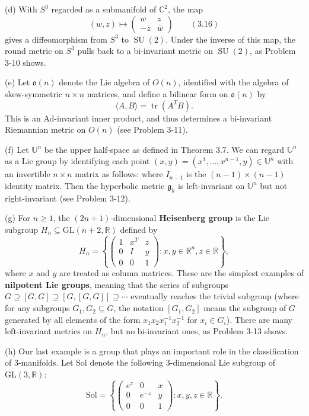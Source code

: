 \begin{example}
(d) With $S^3$ regarded as a submanifold of $\mathbb{C}^2$, the map
\[
(w, z) \mapsto \begin{pmatrix} w & z \\ -\overline{z} & \overline{w} \end{pmatrix} \qquad (3.16)
\]
gives a diffeomorphism from $S^3$ to $\operatorname{SU}(2)$. Under the inverse of this map, the round metric on $S^3$ pulls back to a bi-invariant metric on $\operatorname{SU}(2)$, as Problem 3-10 shows.

(e) Let $\mathfrak{o}(n)$ denote the Lie algebra of $O(n)$, identified with the algebra of skew-symmetric $n \times n$ matrices, and define a bilinear form on $\mathfrak{o}(n)$ by
\[
\langle A, B \rangle = \operatorname{tr}(A^T B).
\]
This is an Ad-invariant inner product, and thus determines a bi-invariant Riemannian metric on $O(n)$ (see Problem 3-11).

(f) Let $\mathbb{U}^n$ be the upper half-space as defined in Theorem 3.7. We can regard $\mathbb{U}^n$ as a Lie group by identifying each point $(x, y) = (x^1, \ldots, x^{n-1}, y) \in \mathbb{U}^n$ with an invertible $n \times n$ matrix as follows:
where $I_{n-1}$ is the $(n-1) \times (n-1)$ identity matrix. Then the hyperbolic metric $\mathfrak{g}_h$ is left-invariant on $\mathbb{U}^n$ but not right-invariant (see Problem 3-12).

(g) For $n \geq 1$, the $(2n+1)$-dimensional \textbf{Heisenberg group} is the Lie subgroup $H_n \subseteq \mathrm{GL}(n+2,\mathbb{R})$ defined by
\[
H_n = \left\{\begin{pmatrix} 1 & x^T & z \\ 0 & I & y \\ 0 & 0 & 1 \end{pmatrix} : x, y \in \mathbb{R}^n, z \in \mathbb{R}\right\},
\]
where $x$ and $y$ are treated as column matrices. These are the simplest examples of \textbf{nilpotent Lie groups}, meaning that the series of subgroups $G \supseteq [G,G] \supseteq [G,[G,G]] \supseteq \cdots$ eventually reaches the trivial subgroup (where for any subgroups $G_1, G_2 \subseteq G$, the notation $[G_1, G_2]$ means the subgroup of $G$ generated by all elements of the form $x_1 x_2 x_1^{-1} x_2^{-1}$ for $x_i \in G_i$). There are many left-invariant metrics on $H_n$, but no bi-invariant ones, as Problem 3-13 shows.

(h) Our last example is a group that plays an important role in the classification of 3-manifolds. Let Sol denote the following 3-dimensional Lie subgroup of $\mathrm{GL}(3,\mathbb{R})$:
\[
\mathrm{Sol} = \left\{\begin{pmatrix} e^z & 0 & x \\ 0 & e^{-z} & y \\ 0 & 0 & 1 \end{pmatrix} : x, y, z \in \mathbb{R}\right\}.
\]


\end{example}
